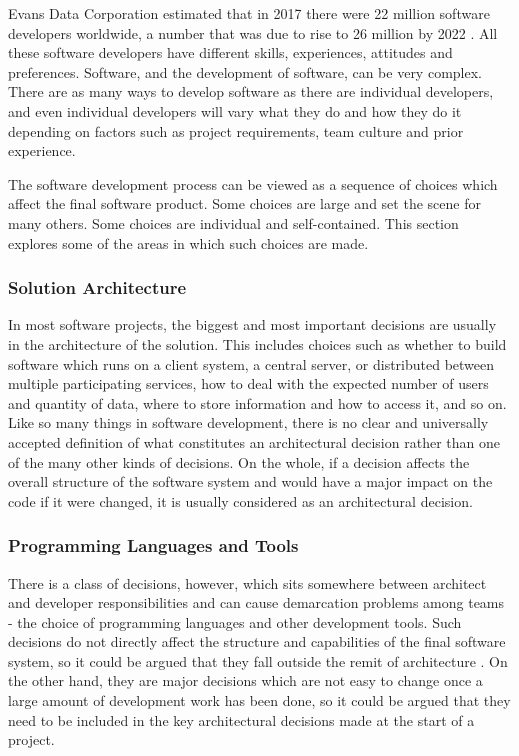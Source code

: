 Evans Data Corporation estimated that in 2017 there were 22 million software developers worldwide, a number that was due to rise to 26 million by 2022 \citep{EvansDataCorporation2018}. All these software developers have different skills, experiences, attitudes and preferences. Software, and the development of software, can be very complex. There are as many ways to develop software as there are individual developers, and even individual developers will vary what they do and how they do it depending on factors such as project requirements, team culture and prior experience.

The software development process can be viewed as a sequence of choices which affect the final software product. Some choices are large and set the scene for many others. Some choices are individual and self-contained. This section explores some of the areas in which such choices are made.

\subsubsection{Solution Architecture}

In most software projects, the biggest and most important decisions are usually in the architecture of the solution. This includes choices such as whether to build software which runs on a client system, a central server, or distributed between multiple participating services, how to deal with the expected number of users and quantity of data, where to store information and how to access it, and so on. Like so many things in software development, there is no clear and universally accepted definition of what constitutes an architectural decision rather than one of the many other kinds of decisions. On the whole, if a decision affects the overall structure of the software system and would have a major impact on the code if it were changed, it is usually considered as an architectural decision.

\subsubsection{Programming Languages and Tools}

There is a class of decisions, however, which sits somewhere between architect and developer responsibilities and can cause demarcation problems among teams - the choice of programming languages and other development tools. Such decisions do not directly affect the structure and capabilities of the final software system, so it could be argued that they fall outside the remit of architecture \citep{Mills1985}. On the other hand, they are major decisions which are not easy to change once a large amount of development work has been done, so it could be argued that they need to be included in the key architectural decisions made at the start of a project. \citep{Spinellis2006}

